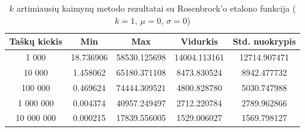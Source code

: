\begin{table}[H]
    \centering
    \begin{tabular}{|c|c|c|c|c|}
        \hline
        \textbf{Taškų kiekis} & \textbf{Min} & \textbf{Max} & \textbf{Vidurkis} & \textbf{Std. nuokrypis} \\ \hline
        1 000        & 18.736906 & 58530.125698 & 14004.113161 & 12714.907471 \\ \hline
        10 000       & 1.458062 & 65180.371108 & 8473.830524 & 8942.477732 \\ \hline
        100 000      & 0.469624 & 74444.309521 & 4800.828780 & 5030.747988 \\ \hline
        1 000 000    & 0.004374 & 40957.249497 & 2712.220784 & 2789.962866 \\ \hline
        10 000 000   & 0.000215 & 17839.556005 & 1529.006027 & 1569.798127 \\ \hline
    \end{tabular}
    \caption{$k$ artimiausių kaimynų metodo rezultatai su Rosenbrock'o etalono funkcija ($k = 1$, $\mu = 0$, $\sigma = 0$)}
\end{table}